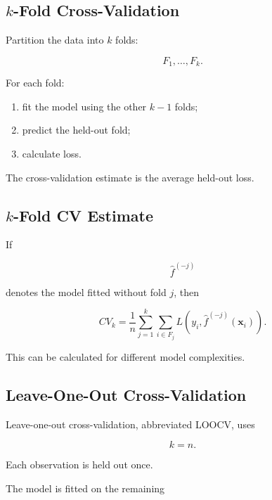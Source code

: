 \subsection{\(k\)-Fold Cross-Validation}
\label{subsec:k-fold-cross-validation}

Partition the data into \(k\) folds:

\[
\boxed{
F_1,\ldots,F_k.
}
\]

For each fold:

\begin{enumerate}
    \item fit the model using the other \(k-1\) folds;
    \item predict the held-out fold;
    \item calculate loss.
\end{enumerate}

The cross-validation estimate is the average held-out loss.

\subsection{\(k\)-Fold CV Estimate}
\label{subsec:kfold-cv-estimate}

If

\[
\widehat{f}^{(-j)}
\]

denotes the model fitted without fold \(j\), then

\[
\boxed{
CV_k
=
\frac1n
\sum_{j=1}^{k}
\sum_{i\in F_j}
L
\left(
y_i,
\widehat{f}^{(-j)}(\mathbf{x}_i)
\right).
}
\]

This can be calculated for different model complexities.

\subsection{Leave-One-Out Cross-Validation}
\label{subsec:loocv}

Leave-one-out cross-validation, abbreviated LOOCV, uses

\[
\boxed{
k=n.
}
\]

Each observation is held out once.

The model is fitted on the remaining

